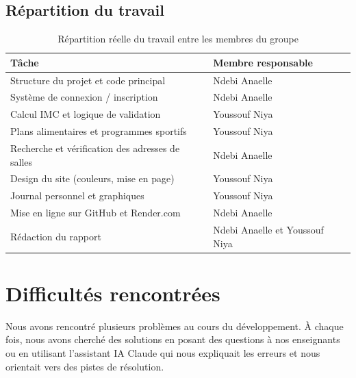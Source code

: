 \documentclass[a4paper, 12pt, twoside]{article}
\begin{document}
\subsection{Répartition du travail}

\begin{table}[h]
\begin{center}
\begin{tabular}{|l|l|}
\hline
\textbf{Tâche} & \textbf{Membre responsable} \\
\hline
Structure du projet et code principal & Ndebi Anaelle \\
\hline
Système de connexion / inscription & Ndebi Anaelle \\
\hline
Calcul IMC et logique de validation & Youssouf Niya \\
\hline
Plans alimentaires et programmes sportifs & Youssouf Niya \\
\hline
Recherche et vérification des adresses de salles & Ndebi Anaelle \\
\hline
Design du site (couleurs, mise en page) & Youssouf Niya \\
\hline
Journal personnel et graphiques & Youssouf Niya \\
\hline
Mise en ligne sur GitHub et Render.com & Ndebi Anaelle \\
\hline
Rédaction du rapport & Ndebi Anaelle et Youssouf Niya \\
\hline
\end{tabular}
\end{center}
\caption{Répartition réelle du travail entre les membres du groupe}
\label{tab:repartition}
\end{table}

\section{Difficultés rencontrées}

Nous avons rencontré plusieurs problèmes au cours du développement. À chaque fois, nous avons cherché des solutions en posant des questions à nos enseignants ou en utilisant l'assistant IA Claude qui nous expliquait les erreurs et nous orientait vers des pistes de résolution.
\end{document}
